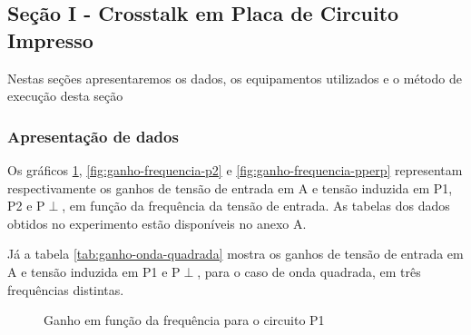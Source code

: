 \documentclass[12pt]{article}
\begin{document}
\subsection{Seção I -  Crosstalk em Placa de Circuito Impresso}
Nestas seções apresentaremos os dados, os equipamentos utilizados e o
método de execução desta seção

\subsubsection{Apresentação de dados}

Os gráficos \ref{fig:ganho-frequencia-p1}, \ref{fig:ganho-frequencia-p2} e
\ref{fig:ganho-frequencia-pperp} representam respectivamente os ganhos de
tensão de entrada em A e tensão induzida em P1, P2 e P$\perp$, em função da
frequência da tensão de entrada. As tabelas dos dados obtidos no
experimento estão disponíveis no anexo A.

Já a tabela \ref{tab:ganho-onda-quadrada} mostra os ganhos de tensão
de entrada em A e tensão induzida em P1 e P$\perp$, para o caso de
onda quadrada, em três frequências distintas.

\begin{figure}[H]
  \captionsetup{name=Gráfico}
  \centering
  \caption{Ganho em função da frequência para o circuito P1}
  \label{fig:ganho-frequencia-p1} %
\end{figure}
\end{document}
